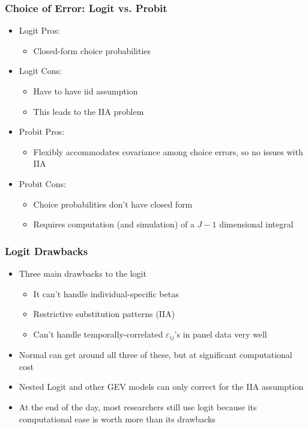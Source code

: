 \documentclass[english,xcolor=dvipsnames]{beamer}
\newcommand{\bi}{\begin{itemize}}
\newcommand{\ei}{\end{itemize}}
\begin{document}
\begin{frame}
\frametitle{Choice of Error: Logit vs. Probit}
   \bi 
   \item Logit Pros:
      \bi 
      \item Closed-form choice probabilities
      \ei
   \item Logit Cons:
      \bi 
      \item Have to have iid assumption
      \item This leads to the IIA problem
      \ei
   \item Probit Pros:
      \bi 
      \item Flexibly accommodates covariance among choice errors, so no issues with IIA
      \ei
   \item Probit Cons:
      \bi 
      \item Choice probabilities don't have closed form
      \item Requires computation (and simulation) of a $J-1$ dimensional integral
      \ei
   \ei
\end{frame}

\begin{frame}
\frametitle{Logit Drawbacks}
   \bi 
   \item Three main drawbacks to the logit
      \bi 
      \item It can't handle individual-specific betas
      \item Restrictive substitution patterns (IIA)
      \item Can't handle temporally-correlated $\varepsilon_{ij}$'s in panel data very well
      \ei
   \item Normal can get around all three of these, but at significant computational cost
   \item Nested Logit and other GEV models can only correct for the IIA assumption
   \item At the end of the day, most researchers still use logit because its computational ease is worth more than its drawbacks
   \ei
\end{frame}
\end{document}
